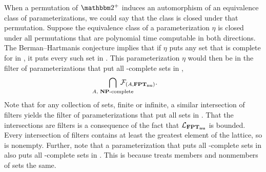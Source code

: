 When a permutation of $\binary^+$ induces an automorphism of an equivalence class of parameterizations, we could say that the class is closed under that permutation.
Suppose the equivalence class of a parameterization $\eta$ is closed under all permutations that are polynomial time computable in both directions.
The Berman--Hartmanis conjecture implies that if $\eta$ puts any set that is complete for  in , it puts every such set in .
This parameterization $\eta$ would then be in the filter of parameterizations that put all -complete sets in ,
\begin{equation*}
  \bigcap_{\mathclap{A\text{, \cl{NP}-complete}}}\ \calF_{(A, \clnu{FPT})}.
\end{equation*}
Note that for any collection of sets, finite or infinite, a similar intersection of filters yields the filter of parameterizations that put all sets in .
That the intersections are filters is a consequence of the fact that $\mathcal{L}_{\textnormal{\textbf{FPT$_\textbf{nu}$}}}$ is bounded.
Every intersection of filters contains at least the greatest element of the lattice, so is nonempty.
Further, note that a parameterization that puts all -complete sets in  also puts all -complete sets in .
This is because  treats members and nonmembers of sets the same.

